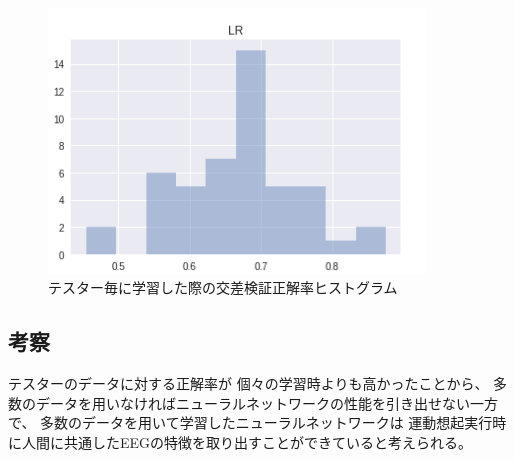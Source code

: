 \begin{figure}[p]
    \centering
    \includegraphics[width=10cm]{images/crosshist.png}
    \caption{テスター毎に学習した際の交差検証正解率ヒストグラム}
    \label{fig:croshis}
\end{figure}

\subsection{\mc 考察}
テスターのデータに対する正解率が
個々の学習時よりも高かったことから、
多数のデータを用いなければニューラルネットワークの性能を引き出せない一方で、
多数のデータを用いて学習したニューラルネットワークは
運動想起実行時に人間に共通したEEGの特徴を取り出すことができていると考えられる。


